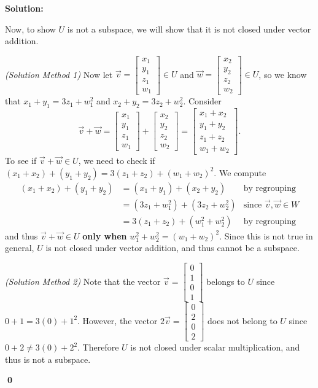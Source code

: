 \documentclass{article}
\newenvironment{solution}
{
  \ignorespaces
  \textbf{Solution:}
}
{
  \ignorespacesafterend
  \begin{flushright}
  {\bfseries \qed}
  \end{flushright}
}
\begin{document}
\begin{solution}
Now, to show \(U\) is not a subspace, we will show that it is not closed under vector addition.


\textit{(Solution Method 1)} Now let 
\(
  \vec v=\begin{bmatrix} x_1 \\y_1 \\ z_1 \\ w_1 \end{bmatrix}\in U
\) and
\(
  \vec w=\begin{bmatrix} x_2 \\y_2 \\ z_2 \\ w_2 \end{bmatrix} \in U
\),
so we know that \(x_1+y_1=3z_1+w_1^2\) and \(x_2+y_2=3z_2+w_2^2\).
Consider
\[\vec{v}+\vec{w}=
\begin{bmatrix} x_1 \\y_1 \\ z_1 \\ w_1\end{bmatrix}
+\begin{bmatrix} x_2 \\y_2 \\ z_2 \\ w_2 \end{bmatrix}
=\begin{bmatrix} x_1+x_2 \\y_1+y_2 \\ z_1+z_2 \\w_1+w_2 \end{bmatrix}
.\]
To see if \(\vec{v}+\vec{w} \in U\), we need to check if \( (x_1+x_2)+(y_1+y_2) = 3(z_1+z_2)+(w_1+w_2)^2\).
We compute
\begin{align*}
  (x_1+x_2)+(y_1+y_2) &= (x_1+y_1)+(x_2+y_2) &\text{by regrouping} \\
  &= (3z_1+w_1^2)+(3z_2+w_2^2) &\text{since \(\vec{v},\vec{w} \in W\)}\\
  &=3(z_1+z_2)+(w_1^2+w_2^2) &\text{by regrouping}
\end{align*}
and thus \(\vec v+\vec w\in U\) \textbf{only when} \(w_1^2+w_2^2=(w_1+w_2)^2\).
Since this is not true in general, \(U\) is not closed under vector addition, and thus cannot be a subspace.

\textit{(Solution Method 2)}
Note that the vector
\(
  \vec v=\begin{bmatrix} 0\\1\\0\\1\end{bmatrix} 
\)
belongs to \(U\) since \(0+1=3(0)+1^2\).
However, the vector
\(
  2\vec v=\begin{bmatrix} 0\\2\\0\\2\end{bmatrix} 
\)
does not belong to \(U\) since \(0+2\not=3(0)+2^2\).
Therefore \(U\) is not closed under scalar multiplication,
and thus is not a subspace.



\end{solution}
\end{document}
